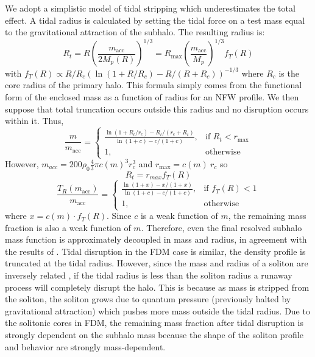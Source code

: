 \documentclass[usenatbib]{mnras}
\begin{document}
	We adopt a simplistic model of tidal stripping which underestimates the total effect. A tidal radius is calculated by setting the tidal force on a test mass equal to the gravitational attraction of the subhalo. The resulting radius is:
\begin{equation}
R_t = R \left(\frac{m_{\text{acc}}}{2M_p(R)}\right)^{1/3} =  R_{\text{max}} \left(\frac{m_{\text{acc}}}{M_p}\right)^{1/3} f_T(R)
\end{equation} 
with $f_T(R) \propto R/R_c(\ln(1+R/R_c) - R/(R+R_c))^{-1/3}$ where $R_c$ is the core radius of the primary halo. This formula simply comes from the functional form of the enclosed mass as a function of radius for an NFW profile. We then suppose that total truncation occurs outside this radius and no disruption occurs within it. Thus,
\begin{equation}
\frac{m}{m_{\text{acc}}} = 
\begin{cases}
\frac{\ln{(1+R_t/r_c)} - R_t/(r_c+R_t)}{\ln{(1+c)} - c/(1+c)},
& \text{if } R_t < r_{\text{max}}
\\
    1,              & \text{otherwise}
\end{cases}
\end{equation} 
However, $m_{acc} = 200 \rho_0 \frac{4}{3} \pi c(m)^3 r_c^3$ and $r_{\text{max}} = c(m) \: r_{c}$ so 
\begin{equation}
R_t = r_{max} f_T(R)
\end{equation}
\begin{equation} \label{trunc}
\frac{T_R(m_{\text{acc}})}{m_{\text{acc}}} =
\begin{cases}
\frac{\ln{(1 + x)} - x/(1 + x)}{\ln{(1+c)} - c/(1+c)},& \text{if } f_T(R) < 1
\\
1, & \text{otherwise}
\end{cases}
\end{equation} 
where $x = c(m) \cdot f_T(R)$. Since $c$ is a weak function of $m$, the remaining mass fraction is also a weak function of $m$. Therefore, even the final resolved subhalo mass function is approximately decoupled in mass and radius, in agreement with the results of \citet{unified_model}. Tidal disruption in the FDM case is similar, the density profile is truncated at the tidal radius. However, since the mass and radius of a soliton are inversely related \citep{solitons}, if the tidal radius is less than the soliton radius a runaway process will completely disrupt the halo. This is because as mass is stripped from the soliton, the soliton grows due to quantum pressure (previously halted by gravitational attraction) which pushes more mass outside the tidal radius. Due to the solitonic cores in FDM, the remaining mass fraction after tidal disruption is strongly dependent on the subhalo mass because the shape of the soliton profile and behavior are strongly mass-dependent. 
\end{document}
